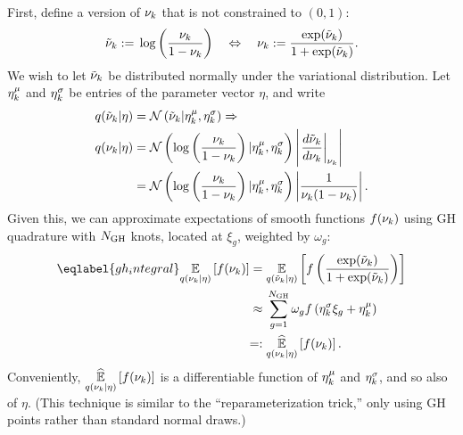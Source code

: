 First, define a version of $\nu_k$ that is not constrained to $(0,1)$:
%
\begin{align*}
%
\lnu_\k :={} \log \left( \frac{\nu_\k}{1 - \nu_\k} \right)
\quad\Leftrightarrow\quad
\nu_\k :={} \frac{\exp(\lnu_\k)}{1 + \exp(\lnu_\k)}.
%
\end{align*}
%
We wish to let $\tilde{\nu}_k$ be distributed normally under the variational
distribution.  Let $\eta^{\mu}_k$ and $\eta^{\sigma}_k$ be entries of the parameter
vector $\eta$, and write
%
\begin{align*}
%
\q(\lnu_\k \vert \eta) ={}& \norm{\lnu_\k \vert \lnumean_\k, \lnusd_\k}
\Rightarrow \\
\q(\nu_\k \vert \eta) ={}&
    \norm{\log \left( \frac{\nu_\k}{1 - \nu_\k} \right)
        \vert \lnumean_\k, \lnusd_\k}
    \left|\fracat{d \lnu_\k}{ d\nu_\k}{\nu_\k}\right|
\\={}&
\norm{\log \left( \frac{\nu_\k}{1 - \nu_\k} \right)
        \vert \lnumean_\k, \lnusd_\k}
    \left|\frac{1}{\nu_\k (1 - \nu_\k)}\right|.
%
\end{align*}
%
Given this, we can approximate expectations of smooth functions
$f(\nu_k)$ using GH quadrature with $N_{\mathrm{GH}}$ knots,
located at $\xi_g$, weighted by $\omega_g$:
%
\begin{align}\eqlabel{gh_integral}
%
\expect{\q(\nu_\k \vert \eta)}{f(\nu_\k)} ={}&
\expect{\q(\lnu_\k \vert \eta)}
       {f\left(\frac{\exp(\lnu_\k)}{1 + \exp(\lnu_\k)}\right)}
\nonumber\\\approx{}&
    \sum_{g=1}^{\ngh} \omega_g f\left(\lnusd_\k \xi_{g} + \lnumean_\k\right)
 \nonumber\\=:{}&
\expecthat{\q(\nu_\k \vert \eta)}{f(\nu_\k)}.
%
\end{align}
%
Conveniently, $\underset{q(\nu_k \vert \eta)}{\widehat{\mathbb{E}}}\left[f(\nu_k)\right]$ is a differentiable
function of $\eta^{\mu}_k$ and $\eta^{\sigma}_k$, and so also of $\eta$.  (This
technique is similar to the ``reparameterization trick,'' only using
GH points rather than standard normal draws.)
